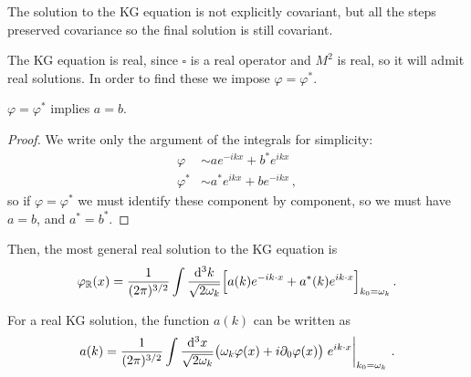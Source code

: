 \documentclass[main.tex]{subfiles}
\begin{document}
The solution to the KG equation is not explicitly covariant, but all the steps preserved covariance so the final solution is still covariant. 

The KG equation is real, since \(\square\) is a real operator and \(M^2\) is real, so it will admit real solutions. 
In order to find these we impose \(\varphi = \varphi^{*}\). 

\begin{claim}
\(\varphi = \varphi^{*}\) implies \(a = b\).
\end{claim}
\begin{proof}
We write only the argument of the integrals for simplicity: 
%
\begin{align}
\varphi &\sim a e^{-ikx} + b^{*} e^{ikx}  \\
\varphi^{*} &\sim a^{*} e^{ikx} + b e^{-ikx}
\,,
\end{align}
%
so if \(\varphi = \varphi^{*}\) we must identify these component by component, so we must have \(a= b\), and \(a^{*} = b^{*}\).
\end{proof}

Then, the most general real solution to the KG equation is 
%
\begin{align}
\varphi_{\mathbb{R}} (x) = \frac{1}{(2 \pi)^{3/2}} 
\int \frac{ \dd[3]{k}}{\sqrt{2 \omega_{k}}}
\qty[a(k) e^{-ik \cdot x} + a^{*} (k) e^{i k \cdot x}]_{k_0 = \omega_{k}}
\,.
\end{align}

\begin{claim}
For a real KG solution, the function \(a(k)\) can be written as 
%
\begin{align}
a(k) = \frac{1}{(2 \pi  )^{3/2}} \int \frac{ \dd[3]{x}}{\sqrt{2 \omega_{k}}} \qty(\omega_{k} \varphi(x) +i \partial_{0} \varphi (x)) \eval{e^{i k \cdot x} }_{k_0 = \omega_{k}} 
\,.
\end{align}
\end{claim}
\end{document}
